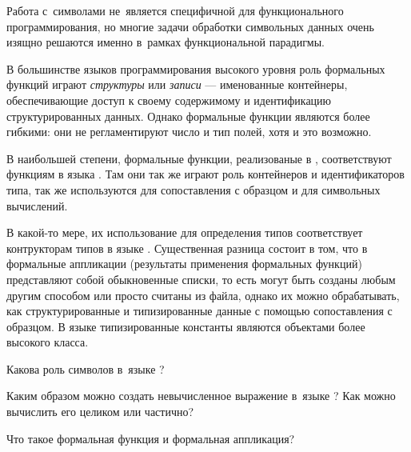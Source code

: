 Работа с~символами не~является специфичной для функционального программирования, но многие задачи обработки символьных данных очень изящно решаются именно в~рамках функциональной парадигмы. 

В большинстве языков программирования высокого уровня роль формальных функций играют \emph{структуры} или \emph{записи} --- именованные контейнеры, обеспечивающие доступ к своему содержимому и идентификацию структурированных данных. Однако  формальные функции являются более гибкими: они не регламентируют число и тип полей, хотя и это возможно.

В наибольшей степени, формальные функции, реализованые в \Scheme, соответствуют функциям в языка . Там они так же играют роль контейнеров и идентификаторов типа, так же используются для сопоставления с образцом и для символьных вычислений.

В какой-то мере, их использование для определения типов соответствует контрукторам типов в языке . Существенная разница состоит в том, что в \Scheme формальные аппликации (результаты применения формальных функций) представляют собой обыкновенные списки, то есть могут быть созданы любым другим способом или просто считаны из файла, однако их можно обрабатывать, как структурированные и типизированные данные с помощью сопоставления с образцом. В языке  типизированные константы являются объектами более высокого класса.

\begin{Queeze}
 \item Какова роль символов в~языке \Scheme?

 \item Каким образом можно создать невычисленное выражение в~языке \Scheme? Как можно вычислить его целиком или частично?

 \item Что такое формальная функция и формальная аппликация?
\end{Queeze}
